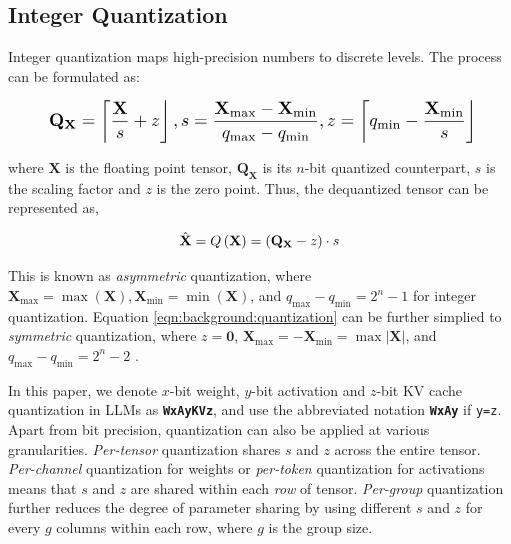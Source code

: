 \subsection{Integer Quantization}

Integer quantization maps high-precision numbers to discrete levels. The process can be formulated as: 


\begin{equation}
\resizebox{0.9\linewidth}{!}{
$\displaystyle 
\small
    \mathbf{Q}_{\mathbf{X}} = \left\lceil \frac{\mathbf{X}}{s}+z\right\rfloor, s=\frac{\mathbf{X}_{\max}-\mathbf{X}_{\min}}{q_{\max}-q_{\min}}, z= \left\lceil q_{\min}-\frac{\mathbf{X}_{\min}}{s}\right\rfloor
$%
}
\label{eqn:background:quantization}
\end{equation}
\vspace{-15pt}

where $\mathbf{X}$ is the floating point tensor, $\mathbf{Q}_{\mathbf{X}}$ is its $n$-bit quantized counterpart, $s$ is the scaling factor and $z$ is the zero point. Thus, the dequantized tensor can be represented as,

\vspace{-10pt}
\begin{equation}
\small
\hat{\mathbf{X}} = Q\left(\mathbf{X}\right) = \left(\mathbf{Q}_{\mathbf{X}} - z\right) \cdot s
\label{eqn:background:dequantization}
\end{equation}
\vspace{-18pt}

This is known as  \textit{asymmetric} quantization, where $\mathbf{X}_{\max} = \max\left(\mathbf{X}\right), \mathbf{X}_{\min} = \min\left(\mathbf{X}\right)$, and $q_{\max} - q_{\min} = 2^{n}-1$ for integer quantization. Equation \ref{eqn:background:quantization} can be further simplied to \textit{symmetric} quantization, where $z = \mathbf{0}$, $\mathbf{X}_{\max} = -\mathbf{X}_{\min} = \max\left|\mathbf{X}\right| $, and $q_{\max} - q_{\min} = 2^{n} -2$ .

In this paper, we denote $x$-bit weight, $y$-bit activation and $z$-bit KV cache quantization in LLMs as \textbf{\texttt{WxAyKVz}}, and use the abbreviated notation \textbf{\texttt{WxAy}} if \texttt{y=z}.  Apart from bit precision, quantization can also be applied at various granularities. \textit{Per-tensor} quantization shares $s$ and $z$ across the entire tensor. \textit{Per-channel} quantization for weights or \textit{per-token} quantization for activations means that $s$ and $z$ are shared within each \textit{row} of tensor. \textit{Per-group} quantization further reduces the degree of parameter sharing by using different $s$ and $z$ for every $g$ columns within each row, where $g$ is the group size.












